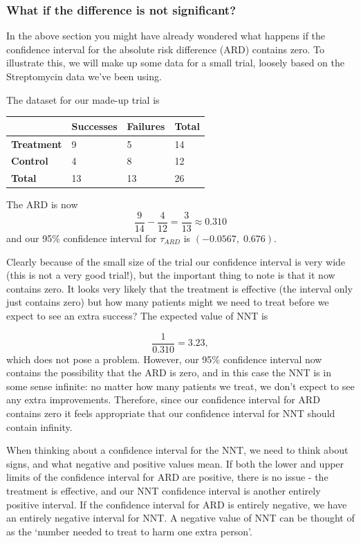 \documentclass[
  openany]{book}
\theoremstyle{definition}
\theoremstyle{definition}
\theoremstyle{definition}
\theoremstyle{definition}
\theoremstyle{remark}
\begin{document}
\subsubsection{What if the difference is not significant?}\label{what-if-the-difference-is-not-significant}

In the above section you might have already wondered what happens if the confidence interval for the absolute risk difference (ARD) contains zero. To illustrate this, we will make up some data for a small trial, loosely based on the Streptomycin data we've been using.

The dataset for our made-up trial is

\begin{longtable}[]{@{}llll@{}}
\toprule\noalign{}
& Successes & Failures & Total \\
\midrule\noalign{}
\endhead
\bottomrule\noalign{}
\endlastfoot
\textbf{Treatment} & 9 & 5 & 14 \\
\textbf{Control} & 4 & 8 & 12 \\
\textbf{Total} & 13 & 13 & 26 \\
\end{longtable}

The ARD is now
\[\frac{9}{14} - \frac{4}{12} = \frac{3}{13} \approx 0.310 \]
and our 95\% confidence interval for \(\tau_{ARD}\) is \(\left(-0.0567,\;0.676\right)\).

Clearly because of the small size of the trial our confidence interval is very wide (this is not a very good trial!), but the important thing to note is that it now contains zero. It looks very likely that the treatment is effective (the interval only just contains zero) but how many patients might we need to treat before we expect to see an extra success? The expected value of NNT is

\[ \frac{1}{0.310} = 3.23,\]
which does not pose a problem. However, our 95\% confidence interval now contains the possibility that the ARD is zero, and in this case the NNT is in some sense infinite: no matter how many patients we treat, we don't expect to see any extra improvements. Therefore, since our confidence interval for ARD contains zero it feels appropriate that our confidence interval for NNT should contain infinity.

When thinking about a confidence interval for the NNT, we need to think about signs, and what negative and positive values mean. If both the lower and upper limits of the confidence interval for ARD are positive, there is no issue - the treatment is effective, and our NNT confidence interval is another entirely positive interval. If the confidence interval for ARD is entirely negative, we have an entirely negative interval for NNT. A negative value of NNT can be thought of as the `number needed to treat to harm one extra person'.
\end{document}
